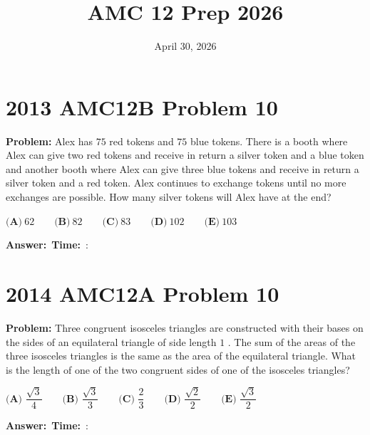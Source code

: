 \documentclass[12pt]{article}
\title{AMC 12 Prep 2026}
\author{}
\date{April 30, 2026}
\begin{document}
\maketitle

\section{2013 AMC12B Problem 10}

\textbf{Problem:}
Alex has $75$ red tokens and $75$ blue tokens. There is a booth where Alex can give two red tokens and receive in return a silver token and a blue token and another booth where Alex can give three blue tokens and receive in return a silver token and a red token. Alex continues to exchange tokens until no more exchanges are possible. How many silver tokens will Alex have at the end?

$\textbf{(A)}\ 62 \qquad \textbf{(B)}\ 82 \qquad \textbf{(C)}\ 83 \qquad \textbf{(D)}\ 102 \qquad \textbf{(E)}\ 103$

\vspace{0.3cm}
\noindent\textbf{Answer:}~\underline{\hspace{5cm}}\hfill\textbf{Time:}~\underline{\hspace{1.2cm}}:\underline{\hspace{1.2cm}}

\vspace{0.5cm}

\section{2014 AMC12A Problem 10}

\textbf{Problem:}
Three congruent isosceles triangles are constructed with their bases on the sides of an equilateral triangle of side length $1$ . The sum of the areas of the three isosceles triangles is the same as the area of the equilateral triangle. What is the length of one of the two congruent sides of one of the isosceles triangles?

$\textbf{(A) }\dfrac{\sqrt3}4\qquad \textbf{(B) }\dfrac{\sqrt3}3\qquad \textbf{(C) }\dfrac23\qquad \textbf{(D) }\dfrac{\sqrt2}2\qquad \textbf{(E) }\dfrac{\sqrt3}2$

\vspace{0.3cm}
\noindent\textbf{Answer:}~\underline{\hspace{5cm}}\hfill\textbf{Time:}~\underline{\hspace{1.2cm}}:\underline{\hspace{1.2cm}}
\end{document}
